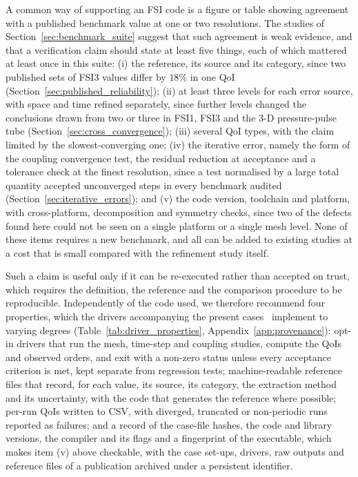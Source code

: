 A common way of supporting an FSI code is a figure or table showing agreement with a published benchmark value at one or two resolutions.
The studies of Section~\ref{sec:benchmark_suite} suggest that such agreement is weak evidence, and that a verification claim should state at least five things, each of which mattered at least once in this suite:
(i) the reference, its source and its category, since two published sets of FSI3 values differ by $18\%$ in one QoI (Section~\ref{sec:published_reliability});
(ii) at least three levels for each error source, with space and time refined separately, since further levels changed the conclusions drawn from two or three in FSI1, FSI3 and the 3-D pressure-pulse tube (Section~\ref{sec:cross_convergence});
(iii) several QoI types, with the claim limited by the slowest-converging one;
(iv) the iterative error, namely the form of the coupling convergence test, the residual reduction at acceptance and a tolerance check at the finest resolution, since a test normalised by a large total quantity accepted unconverged steps in every benchmark audited (Section~\ref{sec:iterative_errors});
and (v) the code version, toolchain and platform, with cross-platform, decomposition and symmetry checks, since two of the defects found here could not be seen on a single platform or a single mesh level.
None of these items requires a new benchmark, and all can be added to existing studies at a cost that is small compared with the refinement study itself.

\label{sec:infrastructure}Such a claim is useful only if it can be re-executed rather than accepted on trust, which requires the definition, the reference and the comparison procedure to be reproducible.
Independently of the code used, we therefore recommend four properties, which the drivers accompanying the present cases~\citep{Cardiff2025} implement to varying degrees (Table~\ref{tab:driver_properties}, Appendix~\ref{app:provenance}): opt-in drivers that run the mesh, time-step and coupling studies, compute the QoIs and observed orders, and exit with a non-zero status unless every acceptance criterion is met, kept separate from regression tests; machine-readable reference files that record, for each value, its source, its category, the extraction method and its uncertainty, with the code that generates the reference where possible; per-run QoIs written to CSV, with diverged, truncated or non-periodic runs reported as failures; and a record of the case-file hashes, the code and library versions, the compiler and its flags and a fingerprint of the executable, which makes item (v) above checkable, with the case set-ups, drivers, raw outputs and reference files of a publication archived under a persistent identifier.

